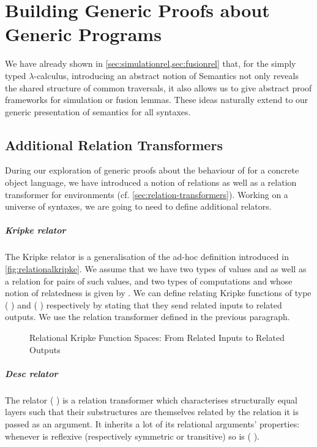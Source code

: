 \chapter{Building Generic Proofs about Generic Programs}

We have already shown in \cref{sec:simulationrel,sec:fusionrel} that, for the
simply typed $\lambda$-calculus, introducing an abstract notion of Semantics
not only reveals the shared structure of common traversals, it also allows
us to give abstract proof frameworks for simulation or fusion lemmas. These
ideas naturally extend to our generic presentation of semantics for all syntaxes.

\section{Additional Relation Transformers}

During our exploration of generic proofs about the behaviour of 
for a concrete object language, we have introduced a notion  of
relations as well as a relation transformer for environments
(cf. \cref{sec:relation-transformers}). Working on a universe of syntaxes,
we are going to need to define additional relators.

\paragraph{Kripke relator}
The Kripke relator is a generalisation of the ad-hoc definition introduced
in \cref{fig:relationalkripke}. We assume that we have two types of values
 and 
as well as a relation  for pairs of such values, and two types
of computations  and  whose notion of relatedness is
given by . We can define
 relating Kripke functions of type
{(  )} and {(  )}
respectively by stating that they send related inputs
to related outputs. We use the relation transformer  defined
in the previous paragraph.

\begin{figure}[h]
\caption{Relational Kripke Function Spaces: From Related Inputs to Related Outputs\label{fig:Kripke-rel}}
\end{figure}

\paragraph{Desc relator}
The relator (  ) is a relation transformer which characterises
structurally equal layers such that their substructures are themselves related
by the relation it is passed as an argument. It inherits a lot of its relational
arguments' properties: whenever  is reflexive (respectively symmetric or
transitive) so is {(   )}.\label{lem:zipstable}

